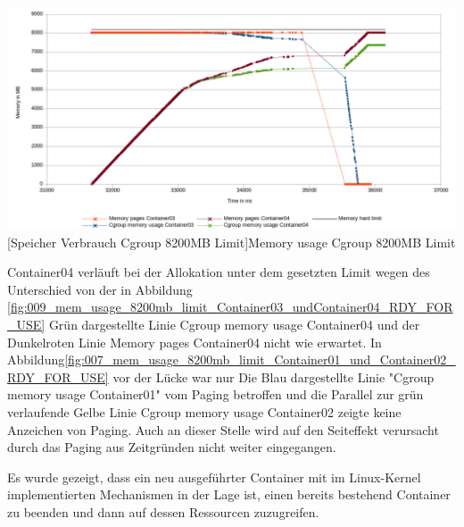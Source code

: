 \vspace{1em}
\begin{minipage}{\linewidth}
	\centering
	\includegraphics[width=1\linewidth]{pics/010_mem_usage_8200mb_limit_Container03_undContainer04_RDY_FOR_USE_Focus.png}
	[Speicher Verbrauch Cgroup 8200MB Limit]{Memory usage Cgroup 8200MB Limit}
	\label{fig:010_mem_usage_8200mb_limit_Container03_undContainer04_RDY_FOR_USE_Focu}
\end{minipage}

Container04 verläuft bei der Allokation unter dem gesetzten Limit wegen des Unterschied von der in Abbildung \ref{fig:009_mem_usage_8200mb_limit_Container03_undContainer04_RDY_FOR_USE} Grün dargestellte Linie \glqq{}Cgroup memory usage Container04\grqq{} und der Dunkelroten Linie \glqq{}Memory pages Container04\grqq{} nicht wie erwartet.  In Abbildung\ref{fig:007_mem_usage_8200mb_limit_Container01_und_Container02_RDY_FOR_USE} vor der Lücke war nur Die Blau dargestellte Linie "Cgroup memory usage Container01" vom Paging betroffen und die Parallel zur grün verlaufende Gelbe Linie \glqq{}Cgroup memory usage Container02\grqq{} zeigte keine Anzeichen von Paging. Auch an dieser Stelle wird auf den Seiteffekt verursacht durch das Paging aus Zeitgründen nicht weiter eingegangen.

Es wurde gezeigt, dass ein neu ausgeführter Container mit im Linux-Kernel implementierten Mechanismen in der Lage ist, einen bereits bestehend Container zu beenden und dann auf dessen Ressourcen zuzugreifen.



\pagebreak
